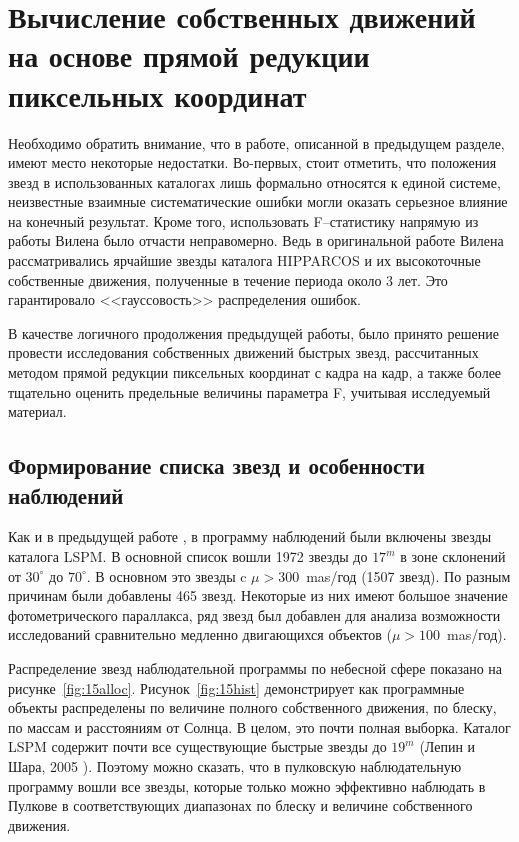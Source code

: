 \section{Вычисление собственных движений на основе прямой редукции пиксельных координат} \label{sec:ch3/sect2}
Необходимо обратить внимание, что в работе, описанной в предыдущем разделе, имеют место некоторые недостатки. Во-первых, стоит отметить, что положения звезд в использованных каталогах лишь формально относятся к единой системе, неизвестные взаимные систематические ошибки могли оказать серьезное влияние на конечный результат. Кроме того, использовать F--статистику напрямую из работы Вилена было отчасти неправомерно. Ведь в оригинальной работе Вилена рассматривались ярчайшие звезды каталога HIPPARCOS и их высокоточные собственные движения, полученные в течение периода около 3 лет. Это гарантировало <<гауссовость>>  распределения ошибок.

В качестве логичного продолжения предыдущей работы, было принято решение провести исследования собственных движений быстрых звезд, рассчитанных методом прямой редукции пиксельных координат с кадра на кадр, а также более тщательно оценить предельные величины параметра F, учитывая исследуемый материал.
\subsection{Формирование списка звезд и особенности наблюдений} \label{subsec:ch3/sect2/sub1}
Как и в предыдущей работе \cite{2011AstL...37..420K}, в программу наблюдений были включены звезды каталога LSPM. В основной список вошли 1972 звезды до $17^m$ в зоне склонений от $30^{\circ}$ до $70^{\circ}$. В основном это звезды c $\mu>300$~mas/год (1507 звезд). По разным причинам были добавлены 465 звезд. Некоторые из них имеют большое значение фотометрического параллакса, ряд звезд был добавлен для анализа возможности исследований сравнительно медленно двигающихся объектов ($\mu>100$~mas/год).

Распределение звезд наблюдательной программы по небесной сфере показано на рисунке~\ref{fig:15alloc}. Рисунок~\ref{fig:15hist} демонстрирует как программные объекты распределены по величине полного собственного движения, по блеску, по массам и расстояниям от Солнца. В целом, это почти полная выборка. Каталог LSPM содержит почти все существующие быстрые звезды до $19^m$ (Лепин и Шара, 2005 ). Поэтому можно сказать, что в пулковскую наблюдательную программу вошли все звезды, которые только можно эффективно наблюдать в Пулкове в соответствующих диапазонах по блеску и величине собственного движения.

